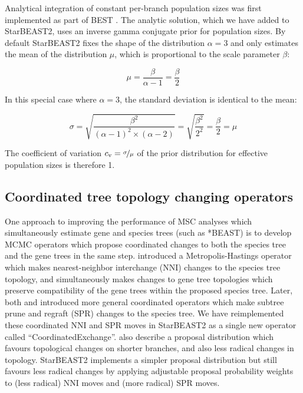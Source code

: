 \documentclass[nogrid]{MBE}%
\begin{document}
Analytical integration of constant per-branch population sizes was first
implemented as part of BEST \citep{EVO:EVO414}. The analytic solution, which we
have added to StarBEAST2, uses an inverse gamma conjugate prior for population
sizes. By default StarBEAST2 fixes the shape of the distribution $\alpha = 3$
and only estimates the mean of the distribution $\mu$, which is proportional to the
scale parameter $\beta$:

\begin{equation}
\mu = \frac{\beta}{\alpha - 1} = \frac{\beta}{2}
\end{equation}

In this special case where $\alpha = 3$, the standard deviation is identical to
the mean:

\begin{equation}
\sigma = \sqrt{\frac{\beta^2}{(\alpha - 1)^2 \times (\alpha - 2)}} = \sqrt{\frac{\beta^2}{2^2}} = \frac{\beta}{2} = \mu
\end{equation}

The coefficient of variation $c_\mathrm{v} = \nicefrac{\sigma}{\mu}$ of the
prior distribution for effective population sizes is therefore 1.

\subsection{Coordinated tree topology changing operators}

One approach to improving the performance of MSC analyses which simultaneously
estimate gene and species trees (such as *BEAST) is to develop MCMC operators
which propose coordinated changes to both the species tree and the gene trees in
the same step. \cite{Yang01122014} introduced a Metropolis-Hastings \citep[MH;][]{Metropolis1953, Hastings1970}
operator which makes nearest-neighbor interchange (NNI) changes to the species
tree topology, and simultaneously makes changes to gene tree topologies which
preserve compatibility of the gene trees within the proposed species tree.
Later, both \cite{Jones2016} and \cite{2015arXiv151203843R} introduced more
general coordinated operators which make subtree prune and regraft (SPR) changes
to the species tree. We have reimplemented these coordinated NNI and SPR moves
in StarBEAST2 as a single new operator called ``CoordinatedExchange''.
\cite{2015arXiv151203843R} also describe a proposal distribution which favours
topological changes on shorter branches, and also less radical changes in
topology. StarBEAST2 implements a simpler proposal distribution but still
favours less radical changes by applying adjustable proposal probability weights
to (less radical) NNI moves and (more radical) SPR moves.
\end{document}
